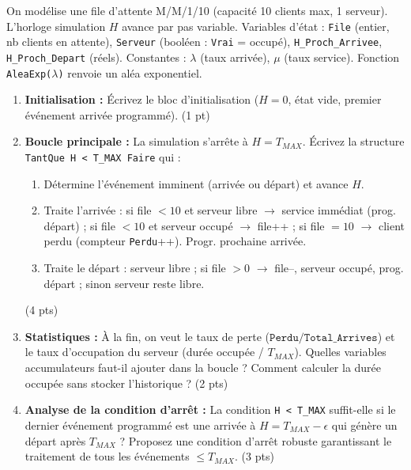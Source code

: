 \documentclass[11pt]{article}
\begin{document}
\begin{exercice}
On modélise une file d'attente M/M/1/10 (capacité 10 clients max, 1 serveur). L'horloge simulation $H$ avance par pas variable. Variables d'état : \texttt{File} (entier, nb clients en attente), \texttt{Serveur} (booléen : \texttt{Vrai} = occupé), \texttt{H\_Proch\_Arrivee}, \texttt{H\_Proch\_Depart} (réels). Constantes : $\lambda$ (taux arrivée), $\mu$ (taux service). Fonction \texttt{AleaExp($\lambda$)} renvoie un aléa exponentiel.

\begin{enumerate}
    \item \textbf{Initialisation :} Écrivez le bloc d'initialisation ($H=0$, état vide, premier événement arrivée programmé). (1 pt)
    \item \textbf{Boucle principale :} La simulation s'arrête à $H = T_{MAX}$. Écrivez la structure \texttt{TantQue H < T\_MAX Faire} qui :
    \begin{enumerate}
        \item Détermine l'événement imminent (arrivée ou départ) et avance $H$.
        \item Traite l'arrivée : si file $< 10$ et serveur libre $\to$ service immédiat (prog. départ) ; si file $< 10$ et serveur occupé $\to$ file++ ; si file $= 10$ $\to$ client perdu (compteur \texttt{Perdu}++). Progr. prochaine arrivée.
        \item Traite le départ : serveur libre ; si file $> 0$ $\to$ file--, serveur occupé, prog. départ ; sinon serveur reste libre.
    \end{enumerate}
    (4 pts)
    \item \textbf{Statistiques :} À la fin, on veut le taux de perte ($\texttt{Perdu}/\texttt{Total\_Arrives}$) et le taux d'occupation du serveur (durée occupée / $T_{MAX}$). Quelles variables accumulateurs faut-il ajouter dans la boucle ? Comment calculer la durée occupée sans stocker l'historique ? (2 pts)
    \item \textbf{Analyse de la condition d'arrêt :} La condition \texttt{H < T\_MAX} suffit-elle si le dernier événement programmé est une arrivée à $H = T_{MAX} - \epsilon$ qui génère un départ après $T_{MAX}$ ? Proposez une condition d'arrêt robuste garantissant le traitement de tous les événements $\le T_{MAX}$. (3 pts)
\end{enumerate}
\end{exercice}
\end{document}
